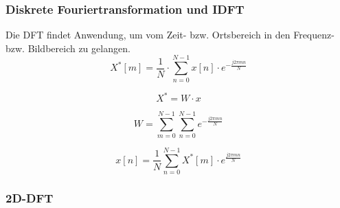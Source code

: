 \begin{frame}\frametitle{Diskrete Fouriertransformation und IDFT}

Die DFT findet Anwendung, um vom Zeit- bzw. Ortsbereich in den Frequenz- bzw. Bildbereich zu gelangen.
\begin{equation}\label{eq:dft}
 X^* \left[ m \right] = \frac{1}{N} \cdot \sum^{N-1}_{n=0} x[n] \cdot e^{-\frac{j 2 \pi m n}{N}}
\end{equation}


\begin{equation}\label{eq:1D-DFT_MatrixMult}
X^* = W \cdot x
\end{equation}

\begin{equation}\label{eq:Twiddlefaktorenberechnung}
W = \sum^{N-1 }_{m=0} \sum^{N-1 }_{n=0} e^{-\frac{j 2 \pi m n}{N}}
\end{equation}

\begin{equation}\label{eq:idft}
 x \left[ n \right] = \frac{1}{N} \sum^{N-1}_{n=0} X^*[m] \cdot e^{\frac{j 2 \pi m n}{N}}
\end{equation}
 
\end{frame}



\begin{frame}\frametitle{2D-DFT}
 
\end{frame}



